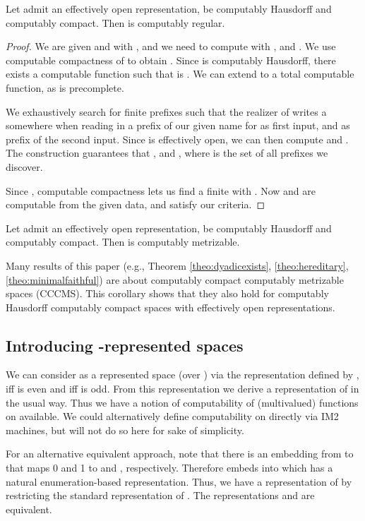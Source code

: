 \documentclass{eptcs-modified}
\begin{document}
\begin{theorem}\label{theorem:coregular}
Let  admit an effectively open representation, be computably Hausdorff and computably compact. Then  is computably regular.
\begin{proof}
We are given  and  with , and we need to compute  with ,  and . We use computable compactness of  to obtain . Since  is computably Hausdorff, there exists a computable function  such that  is . We can extend  to a total computable function, as  is precomplete.

We exhaustively search for finite prefixes  such that the realizer of  writes a  somewhere when reading in a prefix  of our given name for  as first input, and  as prefix of the second input. Since  is effectively open, we can then compute  and . The construction guarantees that ,  and , where  is the set of all prefixes we discover.

Since , computable compactness lets us find a finite  with . Now  and  are computable from the given data, and satisfy our criteria.
\end{proof}
\end{theorem}

\begin{corollary}
Let  admit an effectively open representation, be computably Hausdorff and computably compact. Then  is computably metrizable.
\end{corollary}

Many results of this paper
(e.g., Theorem \ref{theo:dyadicexists}, \ref{theo:hereditary}, \ref{theo:minimalfaithful}) are about computably compact computably metrizable spaces (CCCMS). This corollary shows that they also hold for computably Hausdorff computably compact spaces with effectively open representations.


\subsection{Introducing -represented spaces}
\label{section-introtomega}
We can consider  as a represented space (over ) via the representation  defined by ,  iff  is even and  iff  is odd. From this representation we derive a representation  of  in the usual way.
Thus we have a notion of computability of (multivalued) functions on  available. We could alternatively define computability on  directly via IM2 machines, but will not do so here for sake of simplicity.

For an alternative equivalent approach, note that there is an embedding from  to  that maps
  0 and 1 to  and  , respectively. Therefore
   embeds into  which has a natural enumeration-based representation.  Thus, we have a representation  of
 by restricting the standard representation of . The representations  and  are equivalent.
\end{document}

